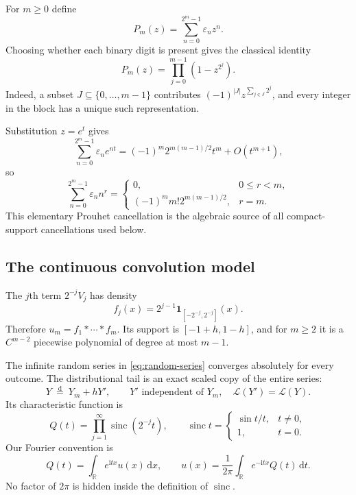\documentclass[11pt,a4paper]{article}
\numberwithin{equation}{section}
\theoremstyle{definition}
\newcommand{\R}{\mathbb R}
\newcommand{\eps}{\varepsilon}
\newcommand{\dd}{\,\mathrm d}
\newcommand{\ii}{\mathrm i}
\newcommand{\sinc}{\operatorname{sinc}}
\newcommand{\Law}{\mathcal L}
\begin{document}
For $m\geq0$ define
\begin{equation}
 P_m(z)=\sum_{n=0}^{2^m-1}\eps_nz^n.
 \label{eq:Pm}
\end{equation}
Choosing whether each binary digit is present gives the classical identity
\begin{equation}
 P_m(z)=\prod_{j=0}^{m-1}(1-z^{2^j}).
 \label{eq:block-product}
\end{equation}
Indeed, a subset $J\subseteq\{0,\ldots,m-1\}$ contributes
$(-1)^{|J|}z^{\sum_{j\in J}2^j}$, and every integer in the block has a
unique such representation.

Substitution $z=e^t$ gives
\begin{equation}
 \sum_{n=0}^{2^m-1}\eps_ne^{nt}
 =(-1)^m2^{m(m-1)/2}t^m+O(t^{m+1}),
\end{equation}
so
\begin{equation}
 \sum_{n=0}^{2^m-1}\eps_n n^r=
 \begin{cases}
 0,&0\leq r<m,\\
 (-1)^m m!2^{m(m-1)/2},&r=m.
 \end{cases}
 \label{eq:prouhet}
\end{equation}
This elementary Prouhet cancellation is the algebraic source of all
compact-support cancellations used below.

\subsection{The continuous convolution model}

The $j$th term $2^{-j}V_j$ has density
\begin{equation}
 f_j(x)=2^{j-1}\mathbf1_{[-2^{-j},2^{-j}]}(x).
\end{equation}
Therefore $u_m=f_1*\cdots*f_m$. Its support is
$[-1+h,1-h]$, and for $m\geq2$ it is a $C^{m-2}$ piecewise polynomial
of degree at most $m-1$.

The infinite random series in \eqref{eq:random-series} converges
absolutely for every outcome. The distributional tail is an exact
scaled copy of the entire series:
\begin{equation}
 Y\ \overset{\mathrm d}=\ Y_m+hY',
 \qquad Y'\text{ independent of }Y_m,\quad \Law(Y')=\Law(Y).
 \label{eq:tail-law}
\end{equation}
Its characteristic function is
\begin{equation}
 Q(t)=\prod_{j=1}^{\infty}\sinc(2^{-j}t),\qquad
 \sinc t=\begin{cases}\sin t/t,&t\ne0,\\1,&t=0.\end{cases}
 \label{eq:Q}
\end{equation}
Our Fourier convention is
\begin{equation}
 Q(t)=\int_{\R}e^{\ii tx}u(x)\dd x,
 \qquad
 u(x)=\frac1{2\pi}\int_{\R}e^{-\ii tx}Q(t)\dd t.
 \label{eq:Fourier-convention}
\end{equation}
No factor of $2\pi$ is hidden inside the definition of $\sinc$.
\end{document}
